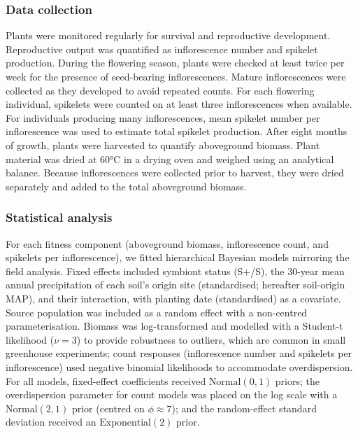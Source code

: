\documentclass[12pt]{article}\usepackage[]{graphicx}\usepackage[dvipsnames]{xcolor}
\begin{document}
\subsubsection {Data collection}

Plants were monitored regularly for survival and reproductive development. 
Reproductive output was quantified as inflorescence number and spikelet production. 
During the flowering season, plants were checked at least twice per week for the presence of seed-bearing inflorescences. 
Mature inflorescences were collected as they developed to avoid repeated counts. 
For each flowering individual, spikelets were counted on at least three inflorescences when available.
For individuals producing many inflorescences, mean spikelet number per inflorescence was used to estimate total spikelet production.
After eight months of growth, plants were harvested to quantify aboveground biomass. 
Plant material was dried at 60°C in a drying oven and weighed using an analytical balance. 
Because inflorescences were collected prior to harvest, they were dried separately and added to the total aboveground biomass.

\subsubsection {Statistical analysis}
{}
\label{sec:greenhouse_models}
For each fitness component (aboveground biomass, inflorescence count, and spikelets per inflorescence), we fitted hierarchical Bayesian models mirroring the field analysis. Fixed effects included symbiont status 
(S+/S\textminus), the 30-year mean annual precipitation of each soil's origin site (standardised; hereafter soil-origin MAP), and their interaction, with planting date (standardised) as a covariate. 
Source population was included as a random effect with a non-centred parameterisation. 
Biomass was log-transformed and modelled with a Student-t likelihood ($\nu = 3$) to provide robustness to outliers, which are common in small greenhouse experiments; count responses (inflorescence number and spikelets 
per inflorescence) used negative binomial likelihoods to accommodate overdispersion. 
For all models, fixed-effect coefficients received $\text{Normal}(0, 1)$ priors; the overdispersion parameter for count models was placed on the log scale with a $\text{Normal}(2, 1)$ prior (centred on $\phi \approx 7$); and the random-effect standard deviation received an $\text{Exponential}(2)$ prior.
\end{document}
